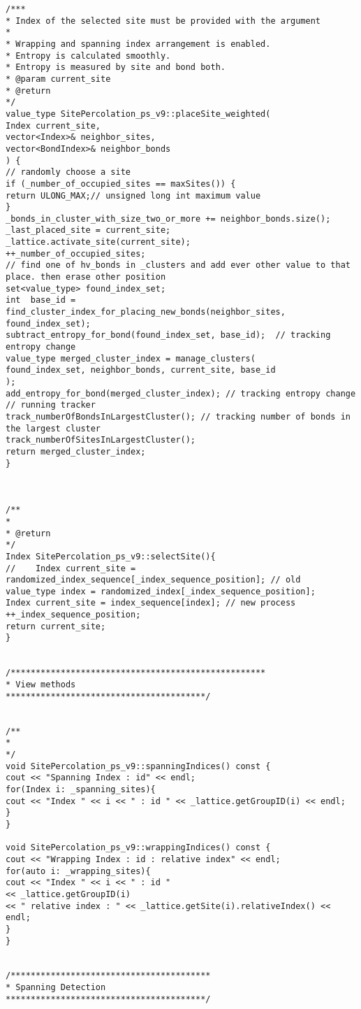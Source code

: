 \begin{lstlisting}[style=CStyle]
/***
* Index of the selected site must be provided with the argument
*
* Wrapping and spanning index arrangement is enabled.
* Entropy is calculated smoothly.
* Entropy is measured by site and bond both.
* @param current_site
* @return
*/
value_type SitePercolation_ps_v9::placeSite_weighted(
Index current_site,
vector<Index>& neighbor_sites,
vector<BondIndex>& neighbor_bonds
) {
// randomly choose a site
if (_number_of_occupied_sites == maxSites()) {
return ULONG_MAX;// unsigned long int maximum value
}
_bonds_in_cluster_with_size_two_or_more += neighbor_bonds.size();
_last_placed_site = current_site;
_lattice.activate_site(current_site);
++_number_of_occupied_sites;
// find one of hv_bonds in _clusters and add ever other value to that place. then erase other position
set<value_type> found_index_set;
int  base_id = find_cluster_index_for_placing_new_bonds(neighbor_sites, found_index_set);
subtract_entropy_for_bond(found_index_set, base_id);  // tracking entropy change
value_type merged_cluster_index = manage_clusters(
found_index_set, neighbor_bonds, current_site, base_id
);
add_entropy_for_bond(merged_cluster_index); // tracking entropy change
// running tracker
track_numberOfBondsInLargestCluster(); // tracking number of bonds in the largest cluster
track_numberOfSitesInLargestCluster();
return merged_cluster_index;
}



/**
*
* @return
*/
Index SitePercolation_ps_v9::selectSite(){
//    Index current_site = randomized_index_sequence[_index_sequence_position]; // old
value_type index = randomized_index[_index_sequence_position];
Index current_site = index_sequence[index]; // new process
++_index_sequence_position;
return current_site;
}


/***************************************************
* View methods
****************************************/


/**
*
*/
void SitePercolation_ps_v9::spanningIndices() const {
cout << "Spanning Index : id" << endl;
for(Index i: _spanning_sites){
cout << "Index " << i << " : id " << _lattice.getGroupID(i) << endl;
}
}

void SitePercolation_ps_v9::wrappingIndices() const {
cout << "Wrapping Index : id : relative index" << endl;
for(auto i: _wrapping_sites){
cout << "Index " << i << " : id "
<< _lattice.getGroupID(i)
<< " relative index : " << _lattice.getSite(i).relativeIndex() << endl;
}
}


/****************************************
* Spanning Detection
****************************************/



\end{lstlisting}
